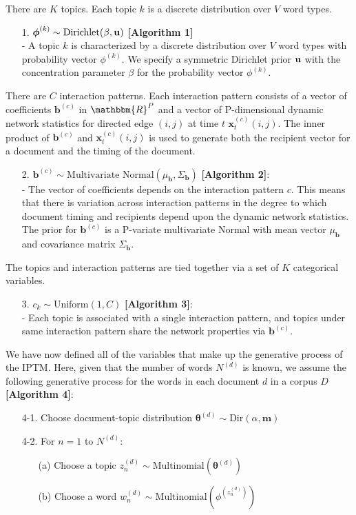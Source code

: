 There are $K$ topics. Each topic $k$ is a discrete distribution over $V$ word types.
\begin{itemize}
	\item[1.] {$\boldsymbol{\phi}^{(k)} \sim \mbox{Dirichlet}(\beta, \bf u)$} \textbf{[Algorithm 1]}\\
	- A topic $k$ is characterized by a discrete distribution over $V$ word types with probability vector $\phi^{(k)}$. We specify a symmetric Dirichlet prior $\bf u$ with the concentration parameter $\beta$ for the probability vector $\phi^{(k)}$.
\end{itemize}
\noindent There are $C$ interaction patterns. Each interaction pattern consists of a vector of coefficients $\boldsymbol{b}^{(c)}$ in $\mathbbm{R}^{P}$ and a vector of P-dimensional dynamic network statistics for directed edge $(i, j)$ at time $t$ $\boldsymbol{x}^{(c)}_t(i, j)$. The inner product of $\boldsymbol{b}^{(c)}$ and $\boldsymbol{x}^{(c)}_t(i, j)$ is used to generate both the recipient vector for a document and the timing of the document.
\begin{itemize}
	\item[2.] $\boldsymbol{b}^{(c)}\sim \mbox{Multivariate Normal}(\mu_{\boldsymbol{b}}, \Sigma_{\boldsymbol{b}})$ \textbf{[Algorithm 2]}: \\
		- The vector of coefficients depends on the interaction pattern $c$. This means that there is variation across interaction patterns in the degree to which document timing and recipients depend upon the dynamic network statistics. The prior for $\boldsymbol{b}^{(c)}$ is a P-variate multivariate Normal with mean vector $\mu_{\boldsymbol{b}}$ and covariance matrix $\Sigma_{\boldsymbol{b}}$.
	\end{itemize}
\noindent The topics and interaction patterns are tied together via a set of $K$ categorical variables.
\begin{itemize}
	\item[3.] $c_k\sim \mbox{Uniform}(1, C)$ \textbf{[Algorithm 3]}: \\
	- Each topic is associated with a single interaction pattern, and topics under same interaction pattern share the network properties via $\boldsymbol{b}^{(c)}$.
\end{itemize}

 We have now defined all of the variables that make up the generative process of the IPTM.  Here, given that the number of words $N^{(d)}$ is known, we assume the following generative process for the words in each document $d$ in a corpus $D$ \textbf{[Algorithm 4]}:
\begin{itemize}
	\item[4-1.] Choose document-topic distribution $\boldsymbol{\theta}^{(d)}\sim \mbox{Dir}(\alpha, \boldsymbol{m})$
	\item[4-2.] For $n=1$ to $N^{(d)}$:
	\begin{itemize}
		\item[(a)] Choose a topic $z_n^{(d)} \sim \mbox{Multinomial}(\boldsymbol{\theta}^{(d)})$
		\item[(b)] Choose a word $w_n^{(d)} \sim\mbox{Multinomial} (\phi^{(z_n^{(d)})})$
	\end{itemize}
\end{itemize}
